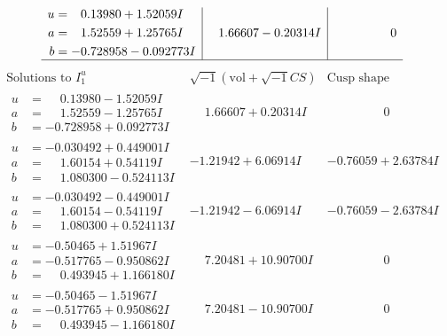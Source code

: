 \documentclass[1p]{elsarticle_modified}
\theoremstyle{definition}
\newcommand{\I}{\sqrt{-1}}
\begin{document}
$$\begin{array}{c|c|c}
\begin{aligned}
u &= \phantom{-}0.13980 + 1.52059 I \\
a &= \phantom{-}1.52559 + 1.25765 I \\
b &= -0.728958 - 0.092773 I\end{aligned}
 & \phantom{-}1.66607 - 0.20314 I & \phantom{-0.000000 } 0\\
 \hline 
 \end{array}$$\newpage$$\begin{array}{c|c|c}  
\text{Solutions to }I^u_{1}& \I (\text{vol} + \sqrt{-1}CS) & \text{Cusp shape}\\
 \hline 
\begin{aligned}
u &= \phantom{-}0.13980 - 1.52059 I \\
a &= \phantom{-}1.52559 - 1.25765 I \\
b &= -0.728958 + 0.092773 I\end{aligned}
 & \phantom{-}1.66607 + 0.20314 I & \phantom{-0.000000 } 0 \\ \hline\begin{aligned}
u &= -0.030492 + 0.449001 I \\
a &= \phantom{-}1.60154 + 0.54119 I \\
b &= \phantom{-}1.080300 - 0.524113 I\end{aligned}
 & -1.21942 + 6.06914 I & -0.76059 + 2.63784 I \\ \hline\begin{aligned}
u &= -0.030492 - 0.449001 I \\
a &= \phantom{-}1.60154 - 0.54119 I \\
b &= \phantom{-}1.080300 + 0.524113 I\end{aligned}
 & -1.21942 - 6.06914 I & -0.76059 - 2.63784 I \\ \hline\begin{aligned}
u &= -0.50465 + 1.51967 I \\
a &= -0.517765 - 0.950862 I \\
b &= \phantom{-}0.493945 + 1.166180 I\end{aligned}
 & \phantom{-}7.20481 + 10.90700 I & \phantom{-0.000000 } 0 \\ \hline\begin{aligned}
u &= -0.50465 - 1.51967 I \\
a &= -0.517765 + 0.950862 I \\
b &= \phantom{-}0.493945 - 1.166180 I\end{aligned}
 & \phantom{-}7.20481 - 10.90700 I & \phantom{-0.000000 } 0 \\ \hline\begin{aligned}

\end{aligned}
\end{array}$$
\end{document}
